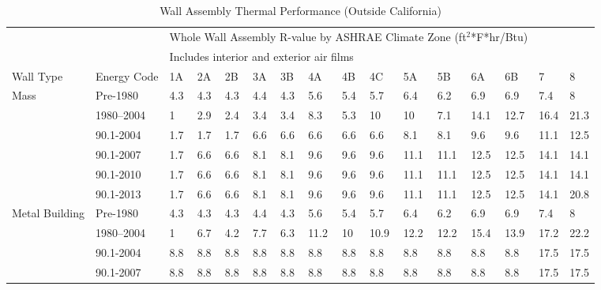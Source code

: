 \begin{table}
\scriptsize
\centering
\caption[Wall Assembly Thermal Performance (Outside California)]{Wall Assembly Thermal Performance (Outside California)}
\label{tab:wall_r_values}
\begin{tabular}{p{0.4in}p{0.5in}p{0.1in}p{0.1in}p{0.1in}p{0.1in}p{0.1in}p{0.1in}p{0.1in}p{0.1in}p{0.1in}p{0.1in}p{0.1in}p{0.1in}p{0.1in}p{0.1in}}
\hline
\multicolumn{2}{l}{} & \multicolumn{12}{l}{Whole Wall Assembly R-value by ASHRAE Climate Zone (ft$^2$*F*hr/Btu)} \\
\multicolumn{2}{l}{} & \multicolumn{12}{l}{Includes interior and exterior air films} &\multicolumn{1}{l}{} \\ \hline
Wall Type     & Energy Code             & 1A   & 2A   & 2B   & 3A   & 3B   & 4A   & 4B   & 4C   & 5A   & 5B   & 6A   & 6B   & 7    & 8     \\ \hline
Mass          & Pre-1980                & 4.3  & 4.3  & 4.3  & 4.4  & 4.3  & 5.6  & 5.4  & 5.7  & 6.4  & 6.2  & 6.9  & 6.9  & 7.4  & 8     \\
              & 1980--2004               & 1    & 2.9  & 2.4  & 3.4  & 3.4  & 8.3  & 5.3  & 10   & 10   & 7.1  & 14.1 & 12.7 & 16.4 & 21.3  \\
              & 90.1-2004               & 1.7  & 1.7  & 1.7  & 6.6  & 6.6  & 6.6  & 6.6  & 6.6  & 8.1  & 8.1  & 9.6  & 9.6  & 11.1 & 12.5  \\
              & 90.1-2007               & 1.7  & 6.6  & 6.6  & 8.1  & 8.1  & 9.6  & 9.6  & 9.6  & 11.1 & 11.1 & 12.5 & 12.5 & 14.1 & 14.1  \\
              & 90.1-2010               & 1.7  & 6.6  & 6.6  & 8.1  & 8.1  & 9.6  & 9.6  & 9.6  & 11.1 & 11.1 & 12.5 & 12.5 & 14.1 & 14.1  \\
              & 90.1-2013               & 1.7  & 6.6  & 6.6  & 8.1  & 8.1  & 9.6  & 9.6  & 9.6  & 11.1 & 11.1 & 12.5 & 12.5 & 14.1 & 20.8  \\
Metal Building & Pre-1980               & 4.3  & 4.3  & 4.3  & 4.4  & 4.3  & 5.6  & 5.4  & 5.7  & 6.4  & 6.2  & 6.9  & 6.9  & 7.4  & 8     \\
              & 1980--2004               & 1    & 6.7  & 4.2  & 7.7  & 6.3  & 11.2 & 10   & 10.9 & 12.2 & 12.2 & 15.4 & 13.9 & 17.2 & 22.2  \\
              & 90.1-2004               & 8.8  & 8.8  & 8.8  & 8.8  & 8.8  & 8.8  & 8.8  & 8.8  & 8.8  & 8.8  & 8.8  & 8.8  & 17.5 & 17.5  \\
              & 90.1-2007               & 8.8  & 8.8  & 8.8  & 8.8  & 8.8  & 8.8  & 8.8  & 8.8  & 8.8  & 8.8  & 8.8  & 8.8  & 17.5 & 17.5  \\

\end{tabular}
\end{table}
